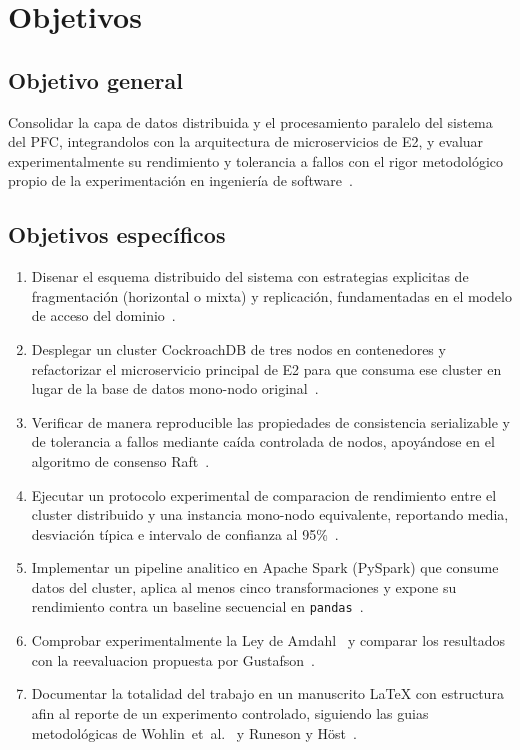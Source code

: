 \documentclass[11pt,a4paper]{article}
\begin{document}
\section{Objetivos}

\subsection{Objetivo general}

    Consolidar la capa de datos distribuida y el procesamiento paralelo del sistema del PFC, integrandolos con la arquitectura de microservicios de E2, y evaluar experimentalmente su rendimiento y tolerancia a fallos con el rigor metodológico propio de la experimentación en ingeniería de software~\cite{Wohlin2012Experimentation}.

\subsection{Objetivos específicos}

    \begin{enumerate}
        \item Disenar el esquema distribuido del sistema con estrategias explicitas de fragmentación (horizontal o mixta) y replicación, fundamentadas en el modelo de acceso del dominio~\cite{Ozsu2020Distributed,Kleppmann2017DDIA}.
        \item Desplegar un cluster CockroachDB de tres nodos en contenedores y refactorizar el microservicio principal de E2 para que consuma ese cluster en lugar de la base de datos mono-nodo original~\cite{Taft2020CockroachDB}.
        \item Verificar de manera reproducible las propiedades de consistencia serializable y de tolerancia a fallos mediante caída controlada de nodos, apoyándose en el algoritmo de consenso Raft~\cite{Ongaro2014Raft}.
        \item Ejecutar un protocolo experimental de comparacion de rendimiento entre el cluster distribuido y una instancia mono-nodo equivalente, reportando media, desviación típica e intervalo de confianza al 95\%~\cite{Jain1991Perf,Cooper2010YCSB}.
        \item Implementar un pipeline analitico en Apache Spark (PySpark) que consume datos del cluster, aplica al menos cinco transformaciones y expone su rendimiento contra un baseline secuencial en \texttt{pandas}~\cite{Zaharia2012RDD,Chambers2018Spark,Salloum2016Spark}.
        \item Comprobar experimentalmente la Ley de Amdahl~\cite{Amdahl1967} y comparar los resultados con la reevaluacion propuesta por Gustafson~\cite{Gustafson1988}.
        \item Documentar la totalidad del trabajo en un manuscrito LaTeX con estructura afin al reporte de un experimento controlado, siguiendo las guias metodológicas de Wohlin~et~al.~\cite{Wohlin2012Experimentation} y Runeson y H\"{o}st~\cite{Runeson2009CaseStudy}.
    \end{enumerate}
\end{document}
